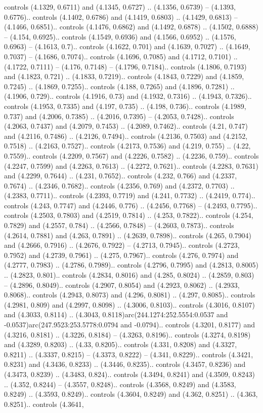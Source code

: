 controls (4.1329, 0.6711) and (4.1345, 0.6727) .. (4.1356, 0.6739) -- (4.1393, 0.6776).. controls (4.1402, 0.6786) and (4.1419, 0.6803) .. (4.1429, 0.6813) -- (4.1466, 0.6851).. controls (4.1476, 0.6862) and (4.1492, 0.6878) .. (4.1502, 0.6888) -- (4.154, 0.6925).. controls (4.1549, 0.6936) and (4.1566, 0.6952) .. (4.1576, 0.6963) -- (4.1613, 0.7).. controls (4.1622, 0.701) and (4.1639, 0.7027) .. (4.1649, 0.7037) -- (4.1686, 0.7074).. controls (4.1696, 0.7085) and (4.1712, 0.7101) .. (4.1722, 0.7111) -- (4.176, 0.7148) -- (4.1796, 0.7184).. controls (4.1806, 0.7193) and (4.1823, 0.721) .. (4.1833, 0.7219).. controls (4.1843, 0.7229) and (4.1859, 0.7245) .. (4.1869, 0.7255).. controls (4.188, 0.7265) and (4.1896, 0.7281) .. (4.1906, 0.729).. controls (4.1916, 0.73) and (4.1932, 0.7316) .. (4.1943, 0.7326).. controls (4.1953, 0.7335) and (4.197, 0.735) .. (4.198, 0.736).. controls (4.1989, 0.737) and (4.2006, 0.7385) .. (4.2016, 0.7395) -- (4.2053, 0.7428).. controls (4.2063, 0.7437) and (4.2079, 0.7453) .. (4.2089, 0.7462).. controls (4.21, 0.747) and (4.2116, 0.7486) .. (4.2126, 0.7494).. controls (4.2136, 0.7503) and (4.2152, 0.7518) .. (4.2163, 0.7527).. controls (4.2173, 0.7536) and (4.219, 0.755) .. (4.22, 0.7559).. controls (4.2209, 0.7567) and (4.2226, 0.7582) .. (4.2236, 0.759).. controls (4.2247, 0.7599) and (4.2263, 0.7613) .. (4.2272, 0.7621).. controls (4.2283, 0.7631) and (4.2299, 0.7644) .. (4.231, 0.7652).. controls (4.232, 0.766) and (4.2337, 0.7674) .. (4.2346, 0.7682).. controls (4.2356, 0.769) and (4.2372, 0.7703) .. (4.2383, 0.7711).. controls (4.2393, 0.7719) and (4.241, 0.7732) .. (4.2419, 0.774).. controls (4.243, 0.7747) and (4.2446, 0.776) .. (4.2456, 0.7768) -- (4.2493, 0.7795).. controls (4.2503, 0.7803) and (4.2519, 0.7814) .. (4.253, 0.7822).. controls (4.254, 0.7829) and (4.2557, 0.784) .. (4.2566, 0.7848) -- (4.2603, 0.7873).. controls (4.2614, 0.7881) and (4.263, 0.7891) .. (4.2639, 0.7898).. controls (4.265, 0.7904) and (4.2666, 0.7916) .. (4.2676, 0.7922) -- (4.2713, 0.7945).. controls (4.2723, 0.7952) and (4.2739, 0.7961) .. (4.275, 0.7967).. controls (4.276, 0.7974) and (4.2777, 0.7983) .. (4.2786, 0.7989).. controls (4.2796, 0.7995) and (4.2813, 0.8005) .. (4.2823, 0.801).. controls (4.2834, 0.8016) and (4.285, 0.8024) .. (4.2859, 0.803) -- (4.2896, 0.8049).. controls (4.2907, 0.8054) and (4.2923, 0.8062) .. (4.2933, 0.8068).. controls (4.2943, 0.8073) and (4.296, 0.8081) .. (4.297, 0.8085).. controls (4.2981, 0.809) and (4.2997, 0.8098) .. (4.3006, 0.8103).. controls (4.3016, 0.8107) and (4.3033, 0.8114) .. (4.3043, 0.8118)arc(244.1274:252.5554:0.0537 and -0.0537)arc(247.9523:253.5778:0.0794 and -0.0794).. controls (4.3201, 0.8177) and (4.3216, 0.8181) .. (4.3226, 0.8184) -- (4.3263, 0.8196).. controls (4.3274, 0.8198) and (4.3289, 0.8203) .. (4.33, 0.8205).. controls (4.331, 0.8208) and (4.3327, 0.8211) .. (4.3337, 0.8215) -- (4.3373, 0.8222) -- (4.341, 0.8229).. controls (4.3421, 0.8231) and (4.3436, 0.8233) .. (4.3446, 0.8235).. controls (4.3457, 0.8236) and (4.3473, 0.8239) .. (4.3483, 0.824).. controls (4.3494, 0.8241) and (4.3509, 0.8243) .. (4.352, 0.8244) -- (4.3557, 0.8248).. controls (4.3568, 0.8249) and (4.3583, 0.8249) .. (4.3593, 0.8249).. controls (4.3604, 0.8249) and (4.362, 0.8251) .. (4.363, 0.8251).. controls (4.3641, 